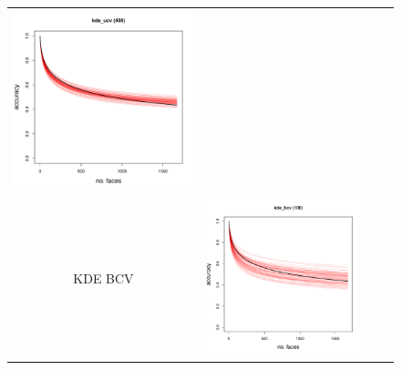 \documentclass[twoside,11pt]{article}
\begin{document}
\begin{figure}
\begin{tabular}{cccc}
\includegraphics[scale = 0.2, clip = true, trim = 0 0 0 0.6in]{repeat_400_kde_ucv.pdf} \\
KDE BCV & 
\includegraphics[scale = 0.2, clip = true, trim = 0 0 0 0.6in]{repeat_100_kde_bcv.pdf} &

\end{tabular}
\end{figure}
\end{document}
